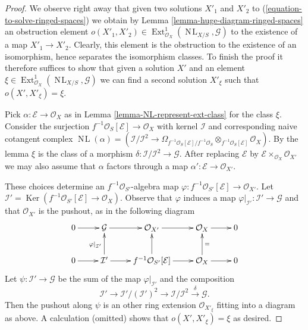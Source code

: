 \documentclass[10pt,a4paper]{amsart}
\theoremstyle{plain}
\theoremstyle{definition}
\theoremstyle{remark}
\numberwithin{equation}{subsection}
\def\Ext{\mathop{\mathrm{Ext}}\nolimits}
\def\NL{\mathop{N\!L}\nolimits}
\def\Ker{\mathop{\mathrm{Ker}}}
\begin{document}
\begin{proof}
We observe right away that given two solutions $X'_1$ and $X'_2$
to (\ref{equation-to-solve-ringed-spaces}) we obtain by
Lemma \ref{lemma-huge-diagram-ringed-spaces} an obstruction element
$o(X'_1, X'_2) \in \Ext^1_{\mathcal{O}_X}(\NL_{X/S}, \mathcal{G})$
to the existence of a map $X'_1 \to X'_2$. Clearly, this element
is the obstruction to the existence of an isomorphism, hence separates
the isomorphism classes. To finish the proof it therefore suffices to
show that given a solution $X'$ and an element
$\xi \in \Ext^1_{\mathcal{O}_X}(\NL_{X/S}, \mathcal{G})$
we can find a second solution $X'_\xi$ such that
$o(X', X'_\xi) = \xi$.

\medskip\noindent
Pick $\alpha : \mathcal{E} \to \mathcal{O}_X$ as in
Lemma \ref{lemma-NL-represent-ext-class}
for the class $\xi$. Consider the surjection
$f^{-1}\mathcal{O}_S[\mathcal{E}] \to \mathcal{O}_X$
with kernel $\mathcal{I}$ and corresponding naive cotangent complex
$\NL(\alpha) = (\mathcal{I}/\mathcal{I}^2 \to
\Omega_{f^{-1}\mathcal{O}_S[\mathcal{E}]/f^{-1}\mathcal{O}_S}
\otimes_{f^{-1}\mathcal{O}_S[\mathcal{E}]} \mathcal{O}_X)$.
By the lemma $\xi$ is the class of a morphism
$\delta : \mathcal{I}/\mathcal{I}^2 \to \mathcal{G}$.
After replacing $\mathcal{E}$ by
$\mathcal{E} \times_{\mathcal{O}_X} \mathcal{O}_{X'}$ we may also assume
that $\alpha$ factors through a map
$\alpha' : \mathcal{E} \to \mathcal{O}_{X'}$.

\medskip\noindent
These choices determine an $f^{-1}\mathcal{O}_{S'}$-algebra map
$\varphi : f^{-1}\mathcal{O}_{S'}[\mathcal{E}] \to \mathcal{O}_{X'}$. Let
$\mathcal{I}' = \Ker(f^{-1}\mathcal{O}_{S'}[\mathcal{E}] \to \mathcal{O}_X)$.
Observe that $\varphi$ induces a map
$\varphi|_{\mathcal{I}'} : \mathcal{I}' \to \mathcal{G}$
and that $\mathcal{O}_{X'}$ is the pushout, as in the following
diagram
$$
\xymatrix{
0 \ar[r] & \mathcal{G} \ar[r] & \mathcal{O}_{X'} \ar[r] &
\mathcal{O}_X \ar[r] & 0 \\
0 \ar[r] & \mathcal{I}' \ar[u]^{\varphi|_{\mathcal{I}'}} \ar[r] &
f^{-1}\mathcal{O}_{S'}[\mathcal{E}] \ar[u] \ar[r] &
\mathcal{O}_X \ar[u]_{=} \ar[r] & 0
}
$$
Let $\psi : \mathcal{I}' \to \mathcal{G}$ be the sum of the map
$\varphi|_{\mathcal{I}'}$ and the composition
$$
\mathcal{I}' \to \mathcal{I}'/(\mathcal{I}')^2 \to
\mathcal{I}/\mathcal{I}^2 \xrightarrow{\delta} \mathcal{G}.
$$
Then the pushout along $\psi$ is an other ring extension
$\mathcal{O}_{X'_\xi}$ fitting into a diagram as above.
A calculation (omitted) shows that $o(X', X'_\xi) = \xi$ as desired.
\end{proof}
\end{document}
